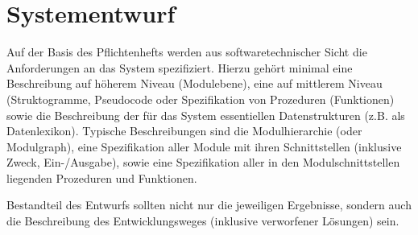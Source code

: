 
\chapter{Systementwurf} %

\label{ch:Systementwurf} %


Auf der Basis des Pflichtenhefts werden aus softwaretechnischer Sicht die
Anforderungen an das System spezifiziert. Hierzu gehört minimal eine
Beschreibung auf höherem Niveau (Modulebene), eine auf mittlerem Niveau
(Struktogramme, Pseudocode oder Spezifikation von Prozeduren (Funktionen) sowie
die Beschreibung der für das System essentiellen Datenstrukturen (z.B. als
Datenlexikon). Typische Beschreibungen sind die Modulhierarchie (oder
Modulgraph), eine Spezifikation aller Module mit ihren Schnittstellen
(inklusive Zweck, Ein-/Ausgabe), sowie eine Spezifikation aller in den
Modulschnittstellen liegenden Prozeduren und Funktionen.

Bestandteil des Entwurfs sollten nicht nur die jeweiligen Ergebnisse, sondern
auch die Beschreibung des Entwicklungsweges (inklusive verworfener Lösungen)
sein.

